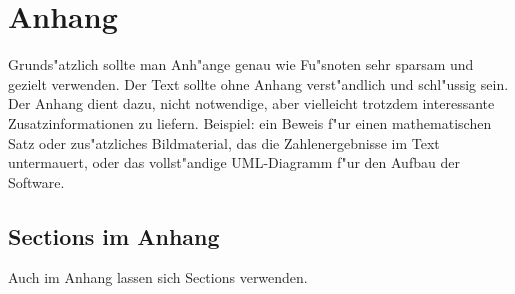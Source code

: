 \appendix
\chapter{Anhang}
\label{cap:Anhang}

Grunds"atzlich sollte man Anh"ange genau wie Fu"snoten sehr sparsam und gezielt verwenden.
Der Text sollte ohne Anhang verst"andlich und schl"ussig sein.
Der Anhang dient dazu, nicht notwendige, aber vielleicht trotzdem interessante Zusatzinformationen zu liefern.
Beispiel: ein Beweis f"ur einen mathematischen Satz oder zus"atzliches Bildmaterial, das die Zahlenergebnisse im Text untermauert, oder das vollst"andige UML-Diagramm f"ur den Aufbau der Software.


\section{Sections im Anhang}

Auch im Anhang lassen sich Sections verwenden.
